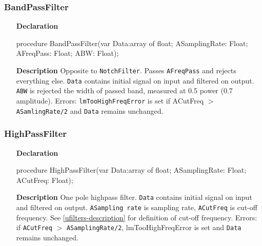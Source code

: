 \documentclass[12pt,a4paper,oneside]{report}
\newcommand{\declarationitem}[1]{\textbf{#1}}
\newcommand{\descriptiontitle}[1]{\textbf{#1}}
\newcommand{\code}[1]{\texttt{#1}}
\begin{document}
\subsubsection{BandPassFilter}
\label{bandpassfilter}
\begin{itemize}
	\item[\declarationitem{Declaration}\hfill]
	\begin{flushleft}
		procedure BandPassFilter(var Data:array of float; ASamplingRate: Float; AFreqPass: Float; ABW: Float);
	\end{flushleft}
	\item[\descriptiontitle{Description}]
	Opposite to \code{NotchFilter}. Passes \code{AFreqPass} and rejects everything else. \code{Data} contains initial signal on input and filtered on output. \code{ABW} is rejected the width of passed band, measured at 0.5 power (0.7 amplitude). Errors: \code{lmTooHighFreqError} is set if ACutFreq $>$ \code{ASamlingRate/2} and \code{Data} remains unchanged. 
\end{itemize}	
\subsubsection{HighPassFilter}
\label{ufilter-highpassfilter}
\begin{itemize}
	\item[\declarationitem{Declaration}\hfill]
	\begin{flushleft}
	procedure HighPassFilter(var Data:array of float; ASamplingRate: Float; ACutFreq: Float);		
	\end{flushleft}
	\item[\descriptiontitle{Description}]
	One pole highpass filter. \code{Data} contains initial signal on input and filtered on output. \code{ASampling rate} is sampling rate, \code{ACutFreq} is cut-off frequency. See \ref{ufilters-description} for definition of cut-off frequency.
	Errors: if \code{ACutFreq} $>$ \code{ASamplingRate/2}, lmTooHighFreqError is set and \code{Data} remains unchanged.
\end{itemize}	
\end{document}
